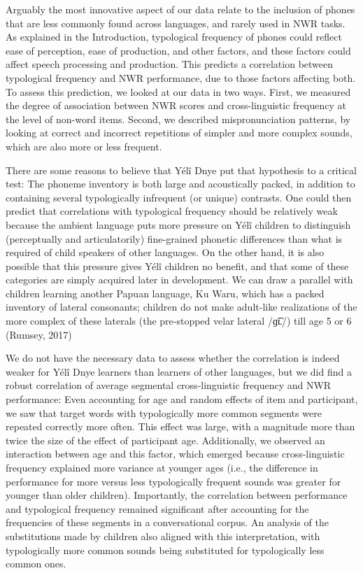 \documentclass[
  american,
  ,man,floatsintext]{apa6}
\begin{document}
Arguably the most innovative aspect of our data relate to the inclusion of phones that are less commonly found across languages, and rarely used in NWR tasks. As explained in the Introduction, typological frequency of phones could reflect ease of perception, ease of production, and other factors, and these factors could affect speech processing and production. This predicts a correlation between typological frequency and NWR performance, due to those factors affecting both. To assess this prediction, we looked at our data in two ways. First, we measured the degree of association between NWR scores and cross-linguistic frequency at the level of non-word items. Second, we described mispronunciation patterns, by looking at correct and incorrect repetitions of simpler and more complex sounds, which are also more or less frequent.

There are some reasons to believe that Yélî Dnye put that hypothesis to a critical test: The phoneme inventory is both large and acoustically packed, in addition to containing several typologically infrequent (or unique) contrasts. One could then predict that correlations with typological frequency should be relatively weak because the ambient language puts more pressure on Yélî children to distinguish (perceptually and articulatorily) fine-grained phonetic differences than what is required of child speakers of other languages. On the other hand, it is also possible that this pressure gives Yélî children no benefit, and that some of these categories are simply acquired later in development. We can draw a parallel with children learning another Papuan language, Ku Waru, which has a packed inventory of lateral consonants; children do not make adult-like realizations of the more complex of these laterals (the pre-stopped velar lateral /ɡ͡ʟ/) till age 5 or 6 (Rumsey, 2017)

We do not have the necessary data to assess whether the correlation is indeed weaker for Yélî Dnye learners than learners of other languages, but we did find a robust correlation of average segmental cross-linguistic frequency and NWR performance: Even accounting for age and random effects of item and participant, we saw that target words with typologically more common segments were repeated correctly more often. This effect was large, with a magnitude more than twice the size of the effect of participant age. Additionally, we observed an interaction between age and this factor, which emerged because cross-linguistic frequency explained more variance at younger ages (i.e., the difference in performance for more versus less typologically frequent sounds was greater for younger than older children). Importantly, the correlation between performance and typological frequency remained significant after accounting for the frequencies of these segments in a conversational corpus. An analysis of the substitutions made by children also aligned with this interpretation, with typologically more common sounds being substituted for typologically less common ones.
\end{document}
